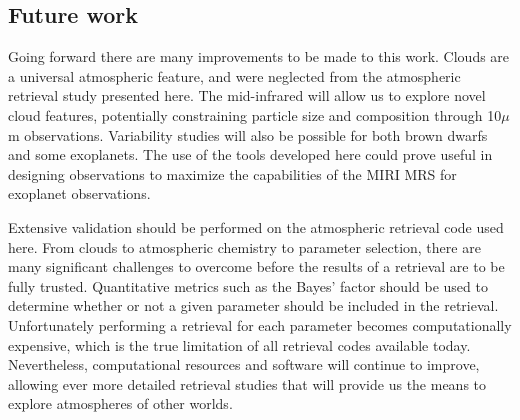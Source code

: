 \subsection{Future work}
Going forward there are many improvements to be made to this work.
Clouds are a universal atmospheric feature, and were neglected from the atmospheric retrieval study presented here.
The mid-infrared will allow us to explore novel cloud features, potentially constraining particle size and composition through 10$\mu$m observations.
Variability studies will also be possible for both brown dwarfs and some exoplanets.
The use of the tools developed here could prove useful in designing observations to maximize the capabilities of the MIRI MRS for exoplanet observations.

Extensive validation should be performed on the atmospheric retrieval code used here.
From clouds to atmospheric chemistry to parameter selection, there are many significant challenges to overcome before the results of a retrieval are to be fully trusted.
Quantitative metrics such as the Bayes' factor should be used to determine whether or not a given parameter should be included in the retrieval.
Unfortunately performing a retrieval for each parameter becomes computationally expensive, which is the true limitation of all retrieval codes available today.
Nevertheless, computational resources and software will continue to improve, allowing ever more detailed retrieval studies that will provide us the means to explore atmospheres of other worlds.